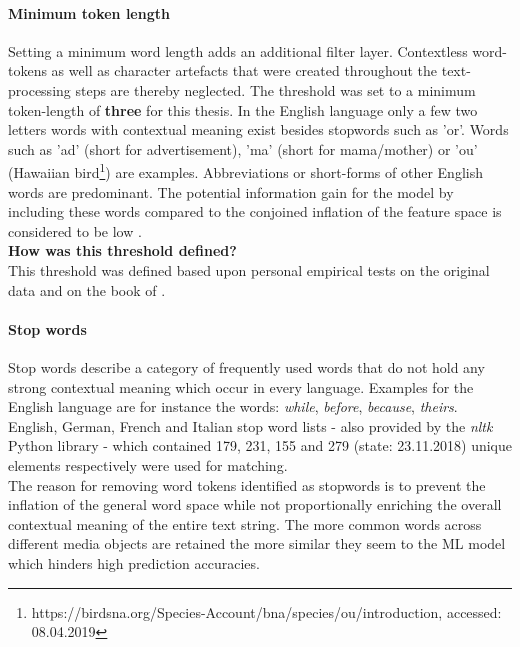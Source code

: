 \paragraph*{Minimum token length}
Setting a minimum word length adds an additional filter layer. Contextless word-tokens as well as character artefacts that were created throughout the text-processing steps are thereby neglected. The threshold was set to a minimum token-length of \textbf{three} for this thesis. In the English language only a few two letters words with contextual meaning exist besides stopwords such as 'or'. Words such as 'ad' (short for advertisement), 'ma' (short for mama/mother) or 'ou' (Hawaiian bird\footnote{https://birdsna.org/Species-Account/bna/species/ou/introduction, accessed: 08.04.2019}) are examples. Abbreviations or short-forms of other English words are predominant. The potential information gain for the model by including these words compared to the conjoined inflation of the feature space is considered to be low \parencite{Guido2016}.\\
\newline
\textbf{How was this threshold defined?}\\
\newline
This threshold was defined based upon personal empirical tests on the original data and on the book of \textcite{Guido2016}.

\paragraph*{Stop words}
Stop words describe a category of frequently used words that do not hold any strong contextual meaning which occur in every language. Examples for the English language are for instance the words: \textit{while}, \textit{before}, \textit{because}, \textit{theirs}.\\
English, German, French and Italian stop word lists - also provided by the \textit{nltk} Python library - which contained 179, 231, 155 and 279 (state: 23.11.2018) unique elements respectively were used for matching.\\
The reason for removing word tokens identified as stopwords is to prevent the inflation of the general word space while not proportionally enriching the overall contextual meaning of the entire text string. The more common words across different media objects are retained the more similar they seem to the ML model which hinders high prediction accuracies.

